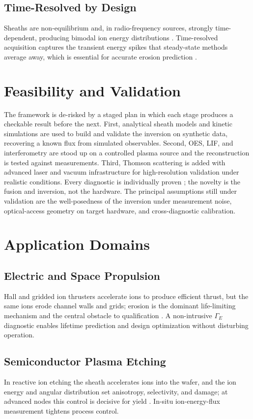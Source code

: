 \documentclass[conference]{IEEEtran}
\newcommand{\GammaE}{\Gamma_{E}}
\begin{document}
\subsection{Time-Resolved by Design}
Sheaths are non-equilibrium and, in radio-frequency sources, strongly time-dependent, producing bimodal ion energy distributions \cite{ref0038,ref0039}. Time-resolved acquisition captures the transient energy spikes that steady-state methods average away, which is essential for accurate erosion prediction \cite{ref0135}.

\section{Feasibility and Validation}
The framework is de-risked by a staged plan in which each stage produces a checkable result before the next. First, analytical sheath models and kinetic simulations are used to build and validate the inversion on synthetic data, recovering a known flux from simulated observables. Second, OES, LIF, and interferometry are stood up on a controlled plasma source and the reconstruction is tested against measurements. Third, Thomson scattering is added with advanced laser and vacuum infrastructure for high-resolution validation under realistic conditions. Every diagnostic is individually proven \cite{ref0261,ref0355,ref0389}; the novelty is the fusion and inversion, not the hardware. The principal assumptions still under validation are the well-posedness of the inversion under measurement noise, optical-access geometry on target hardware, and cross-diagnostic calibration.

\section{Application Domains}
\subsection{Electric and Space Propulsion}
Hall and gridded ion thrusters accelerate ions to produce efficient thrust, but the same ions erode channel walls and grids; erosion is the dominant life-limiting mechanism and the central obstacle to qualification \cite{ref0424,ref0425,ref0459,ref0460,ref0489,ref0490}. A non-intrusive $\GammaE$ diagnostic enables lifetime prediction and design optimization without disturbing operation.

\subsection{Semiconductor Plasma Etching}
In reactive ion etching the sheath accelerates ions into the wafer, and the ion energy and angular distribution set anisotropy, selectivity, and damage; at advanced nodes this control is decisive for yield \cite{ref0513,ref0514,ref0539,ref0540}. In-situ ion-energy-flux measurement tightens process control.
\end{document}
